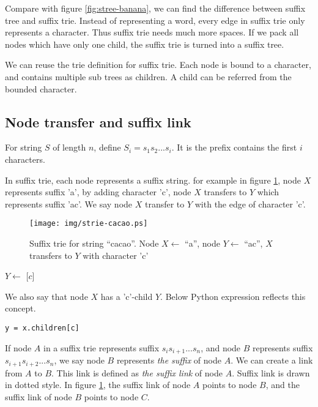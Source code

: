 \documentclass{article}
\begin{document}
Compare with figure \ref{fig:stree-banana}, we can find the difference between
suffix tree and suffix trie. Instead of representing
a word, every edge in suffix trie only represents a character.
Thus suffix trie needs much more spaces.
If we pack all nodes which have only one child, the suffix
trie is turned into a suffix tree.

We can reuse the trie definition for suffix trie. Each node is bound to a
character, and contains multiple sub trees as children. A child can be
referred from the bounded character.

\subsection{Node transfer and suffix link}

For string $S$ of length $n$, define $S_i=s_1s_2...s_i$.
It is the prefix contains the first $i$ characters.

In suffix trie, each node represents a suffix string. for example in figure
\ref{fig:strie-cacao}, node $X$ represents suffix 'a', by adding character 'c',
node $X$ transfers to $Y$ which represents suffix 'ac'. We say node $X$ transfer
to $Y$ with the edge of character 'c'\cite{ukkonen95}.

\begin{figure}[htbp]
  \centering
  \texttt{[image: img/strie-cacao.ps]}
  \caption{Suffix trie for string ``cacao''. Node $X \gets$ ``a'', node $Y \gets$ ``ac'', $X$ transfers to $Y$ with character 'c'}
  \label{fig:strie-cacao}
\end{figure}

\begin{algorithmic}
\State $Y \gets$ [$c$]
\end{algorithmic}

We also say that node $X$ has a 'c'-child $Y$. Below Python expression
reflects this concept.

\lstset{language=python}
\begin{lstlisting}
y = x.children[c]
\end{lstlisting}

If node $A$ in a suffix trie represents suffix $s_is_{i+1}...s_n$,
and node $B$ represents suffix $s_{i+1}s_{i+2}...s_n$, we say node $B$
represents {\em the suffix} of node $A$. We can create a link from $A$ to $B$.
This link is defined as {\em the suffix link} of node $A$\cite{ukkonen95}.
Suffix link is drawn in dotted style. In figure \ref{fig:strie-cacao}, the suffix link of
node $A$ points to node $B$, and the suffix link of node $B$ points to node $C$.
\end{document}
